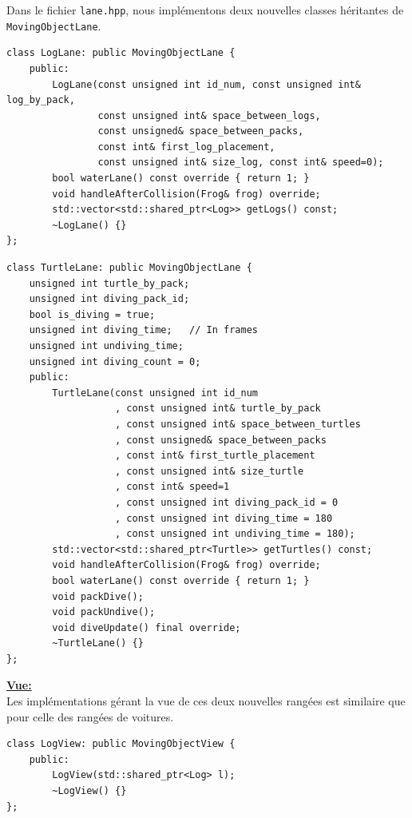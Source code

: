 \documentclass[a4paper, 12pt]{article}
\begin{document}
Dans le fichier \texttt{lane.hpp}, nous implémentons deux nouvelles classes héritantes de \texttt{MovingObjectLane}.

\begin{lstlisting}
class LogLane: public MovingObjectLane {
    public:
        LogLane(const unsigned int id_num, const unsigned int& log_by_pack,
                const unsigned int& space_between_logs,
                const unsigned& space_between_packs,
                const int& first_log_placement,
                const unsigned int& size_log, const int& speed=0);
        bool waterLane() const override { return 1; }
        void handleAfterCollision(Frog& frog) override;
        std::vector<std::shared_ptr<Log>> getLogs() const;
        ~LogLane() {}
};
\end{lstlisting}

\begin{lstlisting}
class TurtleLane: public MovingObjectLane {
    unsigned int turtle_by_pack;
    unsigned int diving_pack_id;
    bool is_diving = true;
    unsigned int diving_time;   // In frames
    unsigned int undiving_time;
    unsigned int diving_count = 0;
    public:
        TurtleLane(const unsigned int id_num
                   , const unsigned int& turtle_by_pack
                   , const unsigned int& space_between_turtles
                   , const unsigned& space_between_packs
                   , const int& first_turtle_placement
                   , const unsigned int& size_turtle
                   , const int& speed=1
                   , const unsigned int diving_pack_id = 0
                   , const unsigned int diving_time = 180
                   , const unsigned int undiving_time = 180);
        std::vector<std::shared_ptr<Turtle>> getTurtles() const;
        void handleAfterCollision(Frog& frog) override;
        bool waterLane() const override { return 1; }
        void packDive();
        void packUndive();
        void diveUpdate() final override;
        ~TurtleLane() {}
};
\end{lstlisting} \hspace{0.5cm}

\underline{\textbf{Vue:}} \\
Les implémentations gérant la vue de ces deux nouvelles rangées est similaire que pour celle 
des rangées de voitures.
\begin{lstlisting}
class LogView: public MovingObjectView {
    public:
        LogView(std::shared_ptr<Log> l);
        ~LogView() {}
};
\end{lstlisting}
\end{document}
